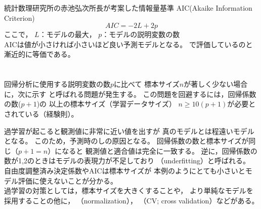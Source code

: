 {
  統計数理研究所の赤池弘次所長が考案した情報量基準
  AIC(Akaike Information Criterion)\\
  \[AIC=-2L+2p\]
  ここで，
  $L$：モデルの最大，
  $p$：モデルの説明変数の数\\
  AICは値が小さければ小さいほど良い予測モデルとなる。
  で評価しているのと漸近的に等価である。
}

\section{}

\MyFrame{\insertsection}
{
  回帰分析に使用する説明変数の数$p$に比べて
  標本サイズ$n$が著しく少ない場合に，次に示す
  と呼ばれる問題が発生する。
  この問題を回避するには，回帰係数の数($p+1$)の
  以上の標本サイズ（学習データサイズ）
  $n\ge10(p+1)$が必要とされている（経験則）。
}

{
  {
  }
}

{
  過学習が起こると観測値に非常に近い値を出すが
  真のモデルとは程遠いモデルとなる。
  このため，予測時のしの原因となる。
  回帰係数の数と標本サイズが同じ（$p+1=n$）になると
  観測値と適合値は完全に一致する。
  逆に，回帰係数の数が1,2のときはモデルの表現力が不足しており
  （underfitting）と呼ばれる。\\
  自由度調整済み決定係数やAICは標本サイズが
  本例のようにとても小さいとモデル評価に使えないことが分かる。\\
  過学習の対策としては，標本サイズを大きくすることや，
  より単純なモデルを採用することの他に，
  （normalization），
  （CV; cross validation）などがある。
}

\section{}

